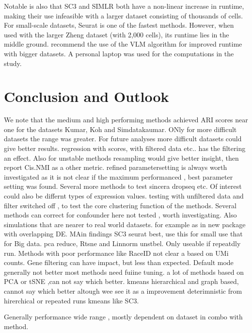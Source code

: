 \documentclass[11pt, a4paper]{article}\usepackage[]{graphicx}\usepackage[]{color}
\begin{document}
Notable is also that SC3 and SIMLR both have a non-linear increase in runtime, making their use infeasible with a larger dataset consisting of thousands of cells. For small-scale datasets, Seurat is one of the fastest methods. However, when used with the larger Zheng dataset (with 2,000 cells), its runtime lies in the middle ground. \citet{butler2017integrated} recommend the use of the VLM algorithm for improved runtime with bigger datasets. 
A personal laptop was used for the computations in the study.

\section{Conclusion and Outlook} 
We note that the medium and high performing methods achieved ARI scores near one for the datasets Kumar, Koh and Simdatakaumar. ONly for more difficult datasets the range was greater. For future analyses more difficult datasets could give better results. regression with scores, with filtered data etc.. has the filtering an effect. 
Also for unstable methods  resampling would give better insight, then report Cis.NMI as a other metric. refined parametersetting is always worth investigated as it is not clear if the maximum performanced , best parameter setting was found. Several more methods to test sincera dropseq etc. 
Of interest could also be differnt types of expression values. 
testing with unfiltered data and filter switched off , to test the core clustering function of the methods.
Several methods can correct for confounder here not tested , worth investigating. Also simulations that are nearer to real world datasets. for example as in new package with overlapping DE. MAin findings SC3 seurat best, use this for small use that for Big data. pca reduce, Rtsne and Linnorm unstbel. Only useable if repeatdly run. Methods with poor performance like RaceID not clear a based on UMi counts. Gene filtering can have impact, but less than expected.  Default mode generally not better most methods need fuiine tuning. a lot of methods based on PCA or tSNE ,can not say which better. kmeans hierarchical and graph based, cannot say which better altough wee see it as a improvement deterimnistic from hirerchical or repeated runs kmeans like SC3.

Generally performance wide range , mostly dependent on dataset in combo with method.
\clearpage
\end{document}
